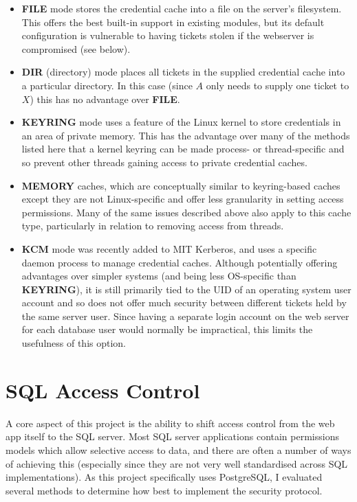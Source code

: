 \documentclass[12pt]{report}
\begin{document}
\begin{itemize}
\item
  \textbf{FILE} mode stores the credential cache into a file on the server's filesystem. This offers the best built-in support in existing modules, but its default configuration is vulnerable to having tickets stolen if the webserver is compromised (see below).
\item
  \textbf{DIR} (directory) mode places all tickets in the supplied credential cache into a particular directory. In this case (since $A$ only needs to supply one ticket to $X$) this has no advantage over \textbf{FILE}.
\item
  \textbf{KEYRING} mode uses a feature of the Linux kernel to store credentials in an area of private memory. This has the advantage over many of the methods listed here that a kernel keyring can be made process- or thread-specific and so prevent other threads gaining access to private credential caches.

\item
  \textbf{MEMORY} caches, which are conceptually similar to keyring-based caches except they are not Linux-specific and offer less granularity in setting access permissions. Many of the same issues described above also apply to this cache type, particularly in relation to removing access from threads.
\item
  \textbf{KCM} mode was recently added to MIT Kerberos, and uses a specific daemon process to manage credential caches. Although potentially offering advantages over simpler systems (and being less OS-specific than \textbf{KEYRING}), it is still primarily tied to the UID of an operating system user account and so does not offer much security between different tickets held by the same server user. Since having a separate login account on the web server for each database user would normally be impractical, this limits the usefulness of this option.
\end{itemize}

\section{SQL Access Control}
\label{sec:sql_access_control}
A core aspect of this project is the ability to shift access control from the web app itself to the SQL server. Most SQL server applications contain permissions models which allow selective access to data, and there are often a number of ways of achieving this (especially since they are not very well standardised across SQL implementations). As this project specifically uses PostgreSQL, I evaluated several methods to determine how best to implement the security protocol.
\end{document}

